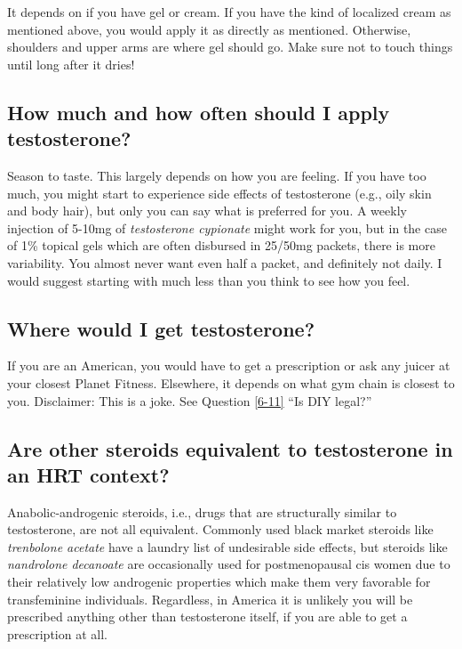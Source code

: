 \documentclass{article}
\begin{document}
It depends on if you have gel or cream. If you have the kind of localized cream as mentioned above, you would apply it as directly as mentioned. Otherwise, shoulders and upper arms are where gel should go. Make sure not to touch things until long after it dries!

\subsection{How much and how often should I apply testosterone?}

Season to taste. This largely depends on how you are feeling. If you have too much, you might start to experience side effects of testosterone (e.g., oily skin and body hair), but only you can say what is preferred for you. A weekly injection of 5-10mg of \textit{testosterone cypionate} might work for you, but in the case of 1\% topical gels which are often disbursed in 25/50mg packets, there is more variability. You almost never want even half a packet, and definitely not daily. I would suggest starting with much less than you think to see how you feel.

\subsection{Where would I get testosterone?}

If you are an American, you would have to get a prescription or ask any juicer at your closest Planet Fitness. Elsewhere, it depends on what gym chain is closest to you. Disclaimer: This is a joke. See Question \ref{6-11} “Is DIY legal?”

\subsection{Are other steroids equivalent to testosterone in an HRT context?}

Anabolic-androgenic steroids, i.e., drugs that are structurally similar to testosterone, are not all equivalent. Commonly used black market steroids like \textit{trenbolone acetate} have a laundry list of undesirable side effects, but steroids like \textit{nandrolone decanoate }are occasionally used for postmenopausal cis women due to their relatively low androgenic properties which make them very favorable for transfeminine individuals. Regardless, in America it is unlikely you will be prescribed anything other than testosterone itself, if you are able to get a prescription at all.
\end{document}
